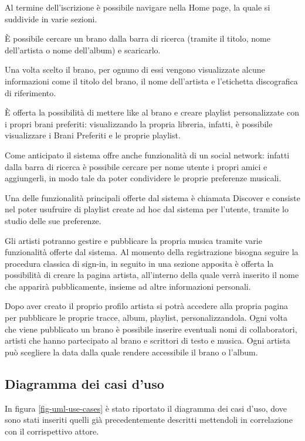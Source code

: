 Al termine dell'iscrizione è possibile navigare nella Home page, la quale si suddivide in varie sezioni. 

È possibile cercare un brano dalla barra di ricerca (tramite il titolo, nome dell'artista o nome 
dell'album) e scaricarlo.

Una volta scelto il brano, per ognuno di essi vengono visualizzate alcune informazioni come il titolo del brano, 
il nome dell'artista e l'etichetta discografica di riferimento.

È offerta la possibilità di mettere like al brano e creare playlist personalizzate con i propri brani preferiti: 
visualizzando la propria libreria, infatti, è possibile visualizzare i Brani Preferiti e le proprie playlist. 

Come anticipato il sistema offre anche funzionalità di un social network: infatti dalla barra di ricerca è possibile 
cercare per nome utente i propri amici e aggiungerli, in modo tale da poter condividere le proprie preferenze musicali. 

Una delle funzionalità principali offerte dal sistema è chiamata Discover e consiste nel poter usufruire di playlist 
create ad hoc dal sistema per l'utente, tramite lo studio delle sue preferenze. 

Gli artisti potranno gestire e pubblicare la propria musica tramite varie funzionalità offerte dal sistema. Al momento 
della registrazione bisogna seguire la procedura classica di sign-in, in seguito in una sezione apposita è offerta la 
possibilità di creare la pagina artista, all'interno della quale verrà inserito il nome che apparirà pubblicamente, 
insieme ad altre informazioni personali. 

Dopo aver creato il proprio profilo artista si potrà accedere alla propria pagina per pubblicare le proprie tracce, 
album, playlist, personalizzandola. Ogni volta che viene pubblicato un brano è possibile inserire eventuali nomi di 
collaboratori, artisti che hanno partecipato al brano e scrittori di testo e musica. Ogni artista può scegliere la 
data dalla quale rendere accessibile il brano o l'album.







\newpage
\subsection{Diagramma dei casi d'uso}

In figura \ref{fig-uml-use-cases} è stato riportato il diagramma dei casi d'uso, dove sono stati inseriti quelli
già precedentemente descritti mettendoli in correlazione con il corrispettivo attore.

